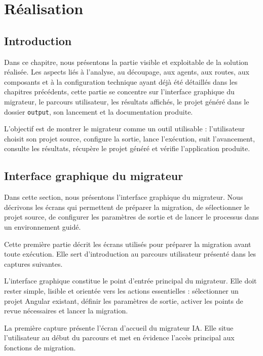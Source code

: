 
\chapter{Réalisation}

\section*{Introduction}

Dans ce chapitre, nous présentons la partie visible et exploitable de la solution réalisée. Les aspects liés à l'analyse, au découpage, aux agents, aux routes, aux composants et à la configuration technique ayant déjà été détaillés dans les chapitres précédents, cette partie se concentre sur l'interface graphique du migrateur, le parcours utilisateur, les résultats affichés, le projet généré dans le dossier \texttt{output}, son lancement et la documentation produite.

L'objectif est de montrer le migrateur comme un outil utilisable : l'utilisateur choisit son projet source, configure la sortie, lance l'exécution, suit l'avancement, consulte les résultats, récupère le projet généré et vérifie l'application produite.

\section{Interface graphique du migrateur}

Dans cette section, nous présentons l'interface graphique du migrateur. Nous décrivons les écrans qui permettent de préparer la migration, de sélectionner le projet source, de configurer les paramètres de sortie et de lancer le processus dans un environnement guidé.

Cette première partie décrit les écrans utilisés pour préparer la migration avant toute exécution. Elle sert d'introduction au parcours utilisateur présenté dans les captures suivantes.

L'interface graphique constitue le point d'entrée principal du migrateur. Elle doit rester simple, lisible et orientée vers les actions essentielles : sélectionner un projet Angular existant, définir les paramètres de sortie, activer les points de revue nécessaires et lancer la migration.

La première capture présente l'écran d'accueil du migrateur IA. Elle situe l'utilisateur au début du parcours et met en évidence l'accès principal aux fonctions de migration.

